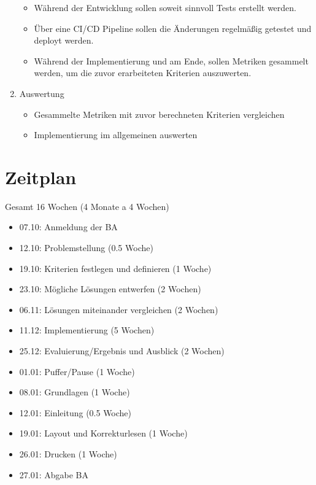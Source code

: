 \begin{enumerate}
  \begin{itemize}
  \item Während der Entwicklung sollen soweit sinnvoll Tests erstellt werden.
  \item Über eine CI/CD Pipeline sollen die Änderungen regelmäßig getestet und deployt werden.
  \item
    Während der Implementierung und am Ende, sollen Metriken gesammelt werden, um die zuvor erarbeiteten Kriterien auszuwerten.
  \end{itemize}
\item
  Auswertung

  \begin{itemize}
  \item
    Gesammelte Metriken mit zuvor berechneten Kriterien vergleichen
  \item
    Implementierung im allgemeinen auswerten
  \end{itemize}
\end{enumerate}

\section{Zeitplan}\label{sec:zeitplan}

Gesamt 16 Wochen (4 Monate a 4 Wochen)

\begin{itemize}
\item
  07.10: Anmeldung der BA
\item
  12.10: Problemstellung (0.5 Woche)
\item
  19.10: Kriterien festlegen und definieren (1 Woche)
\item
  23.10: Mögliche Lösungen entwerfen (2 Wochen)
\item
  06.11: Lösungen miteinander vergleichen (2 Wochen)
\item
  11.12: Implementierung (5 Wochen)
\item
  25.12: Evaluierung/Ergebnis und Ausblick (2 Wochen)
\item
  01.01: Puffer/Pause (1 Woche)
\item
  08.01: Grundlagen (1 Woche)
\item
  12.01: Einleitung (0.5 Woche)
\item
  19.01: Layout und Korrekturlesen (1 Woche)
\item
  26.01: Drucken (1 Woche)
\item
  27.01: Abgabe BA
\end{itemize}
